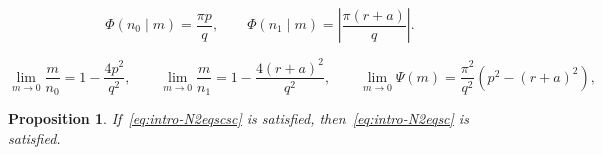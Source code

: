 \documentclass[10pt,a4paper]{amsart}
\newtheorem{proposition}{Proposition}
\begin{document}
\begin{equation}\label{eq:taus-n0n1}
\Phi(n_0\mid m)=\frac{\pi p}q,\qquad
\Phi(n_1\mid m)=\left|\frac{\pi (r+a)}q\right|.
\end{equation}

\begin{equation}\label{eq:taus-limzero}
\lim_{m\to 0}\frac{m}{n_0}=1-\frac{4p^2}{q^2},\qquad
\lim_{m\to 0}\frac{m}{n_1}=1-\frac{4(r+a)^2}{q^2},\qquad
\lim_{m\to 0}\Psi(m)=\frac{\pi^2}{q^2}(p^2-(r+a)^2),
\end{equation}

\begin{proposition}\label{pr:weyl-N2eqscsc}
If~\eqref{eq:intro-N2eqscsc} is satisfied, then~\eqref{eq:intro-N2eqsc} is
satisfied.
\end{proposition}
\end{document}
